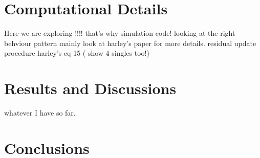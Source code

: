 \section{Computational Details}
Here we are exploring !!!! that's why simulation code!
looking at the right behviour pattern mainly
look at harley's paper for more details.
residual update procedure
harley's eq 15 ( show 4 singles too!)

\section{Results and Discussions}
whatever I have so far.
\section{Conclusions}


